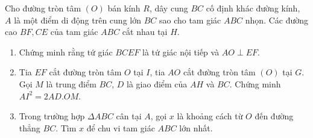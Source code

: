 \begin{ex}%
    Cho đường tròn tâm $(O)$ bán kính $R$, dây cung $BC$ cố định khác đường kính, $A$ là một điểm di động trên cung lớn $BC$ sao cho tam giác $ABC$ nhọn. Các đường cao $BF, CE$ của tam giác $ABC$ cắt nhau tại $H$.
    \begin{enumerate}
        \item Chứng minh rằng tứ giác $BCEF$ là tứ giác nội tiếp và $AO \perp EF$.
        \item Tia $EF$ cắt đường tròn tâm $O$ tại $I$, tia $AO$ cắt đường tròn tâm $(O)$ tại $G$. Gọi $M$ là trung điểm $BC$, $D$ là giao điểm của $AH$ và $BC$. Chứng minh $AI^2=2AD.OM$.
        \item Trong trường hợp $\Delta ABC$ cân tại $A$, gọi $x$ là khoảng cách từ $O$ đến đường thẳng  $BC$. Tìm $x$ để chu vi tam giác $ABC$ lớn nhất.
    \end{enumerate}
\loigiai
    {
    \begin{center}


\end{center}}
\end{ex}
